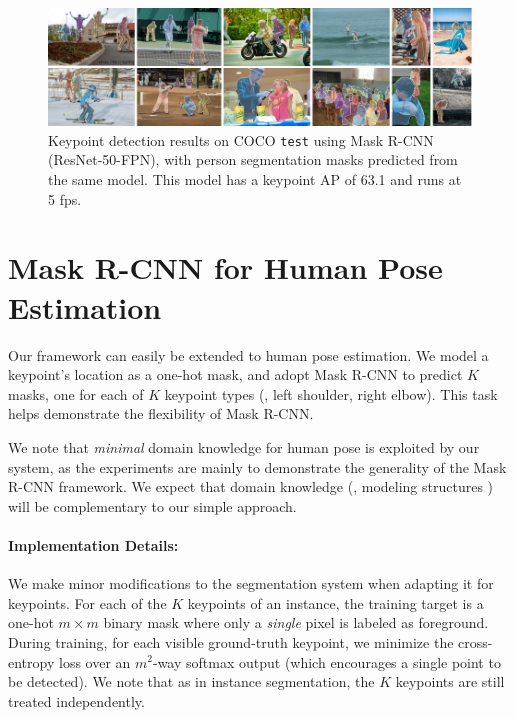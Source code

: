 \documentclass[10pt,twocolumn,letterpaper]{article}
\def\x{\times}
\begin{document}
\begin{figure}[t]
\centering
\includegraphics[width=1.0\linewidth]{ai/results_keypoints}
\caption{Keypoint detection results on COCO \texttt{test} using Mask R-CNN (ResNet-50-FPN), with person segmentation masks predicted from the same model. This model has a keypoint AP of 63.1 and runs at 5 fps.}
\label{fig:results_keypoints}\vspace{-4mm}
\end{figure}

\section{Mask R-CNN for Human Pose Estimation}\label{sec:keypoints}

Our framework can easily be extended to human pose estimation. We model a keypoint's location as a one-hot mask, and adopt Mask R-CNN to predict $K$ masks, one for each of $K$ keypoint types (\eg, left shoulder, right elbow). This task helps demonstrate the flexibility of Mask R-CNN.

We note that \emph{minimal} domain knowledge for human pose is exploited by our system, as the experiments are mainly to demonstrate the generality of the Mask R-CNN framework. We expect that domain knowledge (\eg, modeling structures \cite{Cao2017}) will be complementary to our simple approach.

\paragraph{Implementation Details:} We make minor modifications to the segmentation system when adapting it for keypoints. For each of the $K$ keypoints of an instance, the training target is a one-hot $m \x m$ binary mask where only a \emph{single} pixel is labeled as foreground. During training, for each visible ground-truth keypoint, we minimize the cross-entropy loss over an $m^2$-way softmax output (which encourages a single point to be detected). We note that as in instance segmentation, the $K$ keypoints are still treated independently.
\end{document}
